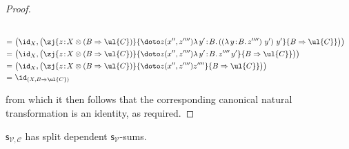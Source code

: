 \begin{proof}
\begin{fleqn}[0.3cm]
\begin{align*}
\\
=\,\, &
\big(\id_X, \big(\zj {z \!:\! X \otimes (B \Rightarrow \ul{C})} {\doto z {(x'',z'''')} {} {\lambda\, y' \!:\! B .\, ((\lambda\, y \!:\! B .\, z'''')\,\, y')\,\, y'}} {B \Rightarrow \ul{C}}\big)\big)
\\
=\,\, &
\big(\id_X, \big(\zj {z \!:\! X \otimes (B \Rightarrow \ul{C})} {\doto z {(x'',z'''')} {} {\lambda\, y' \!:\! B .\, z''''\, y'}} {B \Rightarrow \ul{C}}\big)\big)
\\
=\,\, &
\big(\id_X, \big(\zj {z \!:\! X \otimes (B \Rightarrow \ul{C})} {\doto z {(x'',z'''')} {} {z''''}} {B \Rightarrow \ul{C}}\big)\big)
\\
=\,\, &
\id_{(X,B \Rightarrow \ul{C})}
\end{align*}
\end{fleqn}
from which it then follows that the corresponding canonical natural transformation is an identity, as required.
\end{proof}



\begin{proposition}
$\mathsf{s}_{\mathcal{V},\mathcal{C}}$ has split dependent $\mathsf{s}_{\mathcal{V}}$-sums.
\end{proposition}

